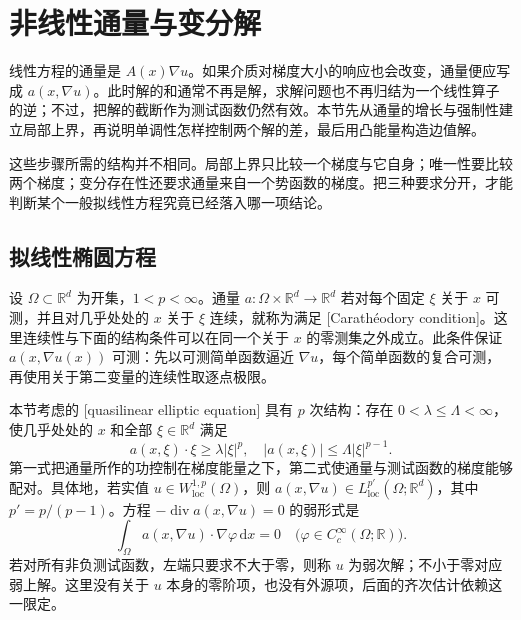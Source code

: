 \section{非线性通量与变分解}
\label{b2:sec:H202}

线性方程的通量是 \(A(x)\nabla u\)。如果介质对梯度大小的响应也会改变，通量便应写成 \(a(x,\nabla u)\)。此时解的和通常不再是解，求解问题也不再归结为一个线性算子的逆；不过，把解的截断作为测试函数仍然有效。本节先从通量的增长与强制性建立局部上界，再说明单调性怎样控制两个解的差，最后用凸能量构造边值解。

\ProseParagraphBreak

这些步骤所需的结构并不相同。局部上界只比较一个梯度与它自身；唯一性要比较两个梯度；变分存在性还要求通量来自一个势函数的梯度。把三种要求分开，才能判断某个一般拟线性方程究竟已经落入哪一项结论。

\subsection{拟线性椭圆方程}
\label{b2:subsec:H20201}

设 \(\Omega\subset\mathbb R^d\) 为开集，\(1<p<\infty\)。通量 \(a:\Omega\times\mathbb R^d\to\mathbb R^d\) 若对每个固定 \(\xi\) 关于 \(x\) 可测，并且对几乎处处的 \(x\) 关于 \(\xi\) 连续，就称为满足 [Carathéodory condition]。这里连续性与下面的结构条件可以在同一个关于 \(x\) 的零测集之外成立。此条件保证 \(a(x,\nabla u(x))\) 可测：先以可测简单函数逼近 \(\nabla u\)，每个简单函数的复合可测，再使用关于第二变量的连续性取逐点极限。

\ProseParagraphBreak

本节考虑的 [quasilinear elliptic equation] 具有 \(p\) 次结构：存在 \(0<\lambda\le\Lambda<\infty\)，使几乎处处的 \(x\) 和全部 \(\xi\in\mathbb R^d\) 满足
\[
 a(x,\xi)\cdot\xi\ge\lambda|\xi|^p,
 \quad |a(x,\xi)|\le\Lambda|\xi|^{p-1}.
\]
第一式把通量所作的功控制在梯度能量之下，第二式使通量与测试函数的梯度能够配对。具体地，若实值 \(u\in W^{1,p}_{\mathrm{loc}}(\Omega)\)，则 \(a(x,\nabla u)\in L^{p'}_{\mathrm{loc}}(\Omega;\mathbb R^d)\)，其中 \(p'=p/(p-1)\)。方程 \(-\operatorname{div}a(x,\nabla u)=0\) 的弱形式是
\[
 \int_\Omega a(x,\nabla u)\cdot\nabla\varphi\,\mathrm dx=0
 \quad\bigl(\varphi\in C_c^\infty(\Omega;\mathbb R)\bigr).
\]
若对所有非负测试函数，左端只要求不大于零，则称 \(u\) 为弱次解；不小于零对应弱上解。这里没有关于 \(u\) 本身的零阶项，也没有外源项，后面的齐次估计依赖这一限定。

